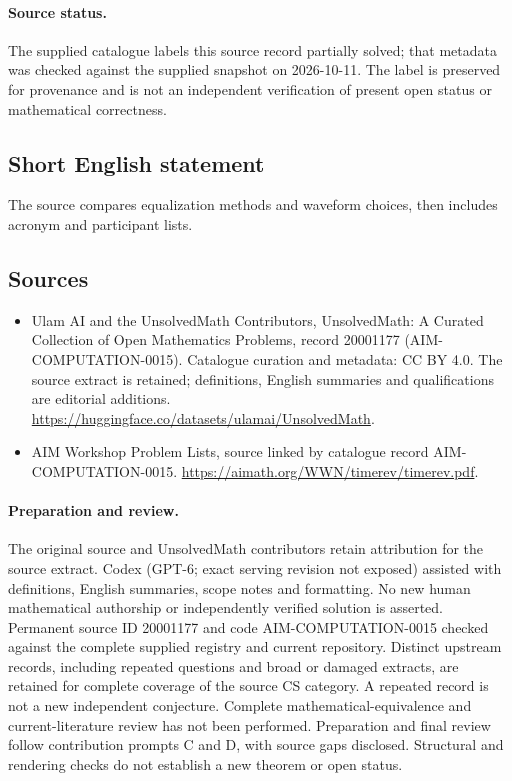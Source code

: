 \documentclass[11pt]{article}
\begin{document}
\paragraph{Source status.}
The supplied catalogue labels this source record partially solved; that metadata was checked against the supplied snapshot on 2026-10-11. The label is preserved for provenance and is not an independent verification of present open status or mathematical correctness.
\subsection{Short English statement}
The source compares equalization methods and waveform choices, then includes acronym and participant lists.
\subsection{Sources}
\begin{itemize}
\item[\hypertarget{source:20001177:1}{S1}] Ulam AI and the UnsolvedMath Contributors, UnsolvedMath: A Curated Collection of Open Mathematics Problems, record 20001177 (AIM-COMPUTATION-0015). Catalogue curation and metadata: CC BY 4.0. The source extract is retained; definitions, English summaries and qualifications are editorial additions.
\url{https://huggingface.co/datasets/ulamai/UnsolvedMath}.
\item[\hypertarget{source:20001177:2}{S2}] AIM Workshop Problem Lists, source linked by catalogue record AIM-COMPUTATION-0015.
\url{https://aimath.org/WWN/timerev/timerev.pdf}.
\end{itemize}
\paragraph{Preparation and review.}
The original source and UnsolvedMath contributors retain attribution for the source extract. Codex (GPT-6; exact serving revision not exposed) assisted with definitions, English summaries, scope notes and formatting. No new human mathematical authorship or independently verified solution is asserted. Permanent source ID 20001177 and code AIM-COMPUTATION-0015 checked against the complete supplied registry and current repository. Distinct upstream records, including repeated questions and broad or damaged extracts, are retained for complete coverage of the source CS category. A repeated record is not a new independent conjecture. Complete mathematical-equivalence and current-literature review has not been performed. Preparation and final review follow contribution prompts C and D, with source gaps disclosed. Structural and rendering checks do not establish a new theorem or open status.
\label{end:20001177}
\end{document}
